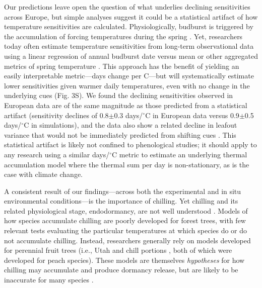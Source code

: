 \documentclass{article}
\begin{document}
\par Our predictions leave open the question of what underlies declining sensitivities across Europe, but simple analyses suggest it could be a statistical artifact of how temperature sensitivities are calculated. Physiologically, budburst is triggered by the accumulation of forcing temperatures during the spring \citep{hanninen1995,chuine2016}. Yet, researchers today often estimate temperature sensitivities from long-term observational data using a linear regression of annual budburst date versus mean or other aggregated metrics of spring temperature \citep[e.g.,][]{Wolkovich:2012n}. This approach has the benefit of yielding an easily interpretable metric---days change per \degree C---but will systematically estimate lower sensitivities given warmer daily temperatures, even with no change in the underlying cues (Fig. 3S). We found the declining sensitivities observed in European data are of the same magnitude as those predicted from a statistical artifact (sensitivity declines of 0.8$\pm$0.3 days/$^{\circ}$C in European data versus 0.9$\pm$0.5 days/$^{\circ}$C in simulations), and the data also show a related decline in leafout variance that would not be immediately predicted from shifting cues \citep[see \emph{Understanding declines in temperature sensitivity in European long-term data} in the Supplemental Materials and ][for further details]{gusewell2017}. This statistical artifact is likely not confined to phenological studies; it should apply to any research using a similar days/$^{\circ}$C metric to estimate an underlying thermal accumulation model where the thermal sum per day is non-stationary, as is the case with climate change. 

\par A consistent result of our findings---across both the experimental and in situ environmental conditions---is the importance of chilling. Yet chilling and its related physiological stage, endodormancy, are not well understood \citep{chuine2016}. Models of how species accumulate chilling are poorly developed for forest trees, with few relevant tests evaluating the particular temperatures at which species do or do not accumulate chilling. Instead, researchers generally rely on models developed for perennial fruit trees (i.e., Utah \citep{richardson1974} and chill portions \citep{fishman1987}, both of which were developed for peach species). These models are themselves \emph{hypotheses} for how chilling may accumulate and produce dormancy release, but are likely to be inaccurate for many species \citep{dennis2003}. 
\end{document}
